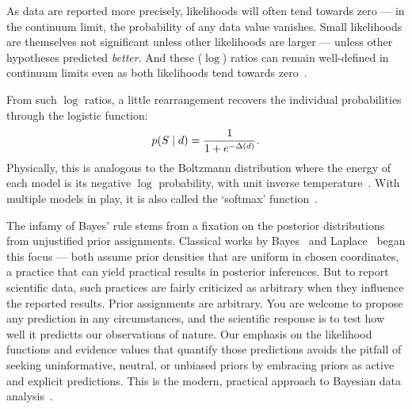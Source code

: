 As data are reported more precisely, likelihoods will often tend towards zero
--- in the continuum limit, the probability of any data value vanishes.
Small likelihoods are themselves not significant unless other likelihoods
are larger --- unless other hypotheses predicted \emph{better}.
And these ($\log$) ratios can remain well-defined in continuum limits even as
both likelihoods tend towards zero~\cite{billingsley2008probability}.

From such $\log$ ratios, a little rearrangement recovers the individual
probabilities through the logistic function:
\begin{equation}
\label{eqn:searches_logistic}
p(S \mid d) = \frac{1}{1 + e^{-\Delta(d)}}
.
\end{equation}
Physically, this is analogous to the Boltzmann distribution where the energy
of each model is its negative $\log$ probability, with unit inverse
temperature~\cite{
pmlr-v2-ranzato07a,
skilling2017david
}.
With multiple models in play, it is also called the `softmax'
function~\cite{MurphyKevinP.2012Mlap}.

The infamy of Bayes' rule stems from a fixation on the posterior distributions
from unjustified prior assignments.
Classical works by
Bayes~\cite{bayes1763lii} and
Laplace~\cite{laplace1774stigler} began this focus ---
both assume prior densities that are uniform in chosen coordinates, a practice
that can yield practical results in posterior inferences.
But to report scientific data, such practices are fairly criticized as
arbitrary when they influence the reported results.
Prior assignments are arbitrary.
You are welcome to propose any prediction in any circumstances, and the
scientific response is to test how well it predictts our observations of nature.
Our emphasis on the likelihood functions and evidence values that quantify
those predictions avoids the pitfall of seeking uninformative, neutral, or
unbiased priors by embracing priors as active and explicit predictions.
This is the modern, practical approach to Bayesian data analysis~\cite{
mackay2003information,
skilling2004nested,
skilling2006nested,
sivia2006data,
skilling2010foundations
}.

